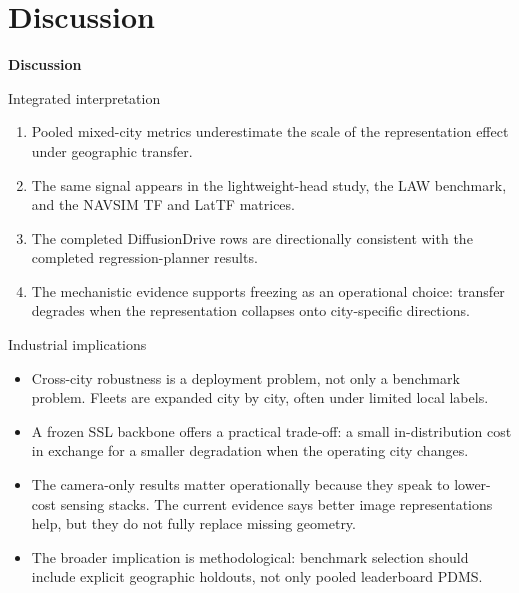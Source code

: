 \documentclass[aspectratio=169, xcolor={table}]{beamer}
\newcommand{\sectiondivider}[1]{%
  \begin{frame}[plain]
    \centering
    \vfill
    {\LARGE \textbf{#1}\par}
    \vfill
  \end{frame}
}
\begin{document}
\section{Discussion}

\sectiondivider{Discussion}

\begin{frame}{Integrated interpretation}
  \begin{enumerate}
    \item Pooled mixed-city metrics underestimate the scale of the representation effect under geographic transfer.
    \item The same signal appears in the lightweight-head study, the LAW benchmark, and the NAVSIM TF and LatTF matrices.
    \item The completed DiffusionDrive rows are directionally consistent with the completed regression-planner results.
    \item The mechanistic evidence supports freezing as an operational choice: transfer degrades when the representation collapses onto city-specific directions.
  \end{enumerate}
\end{frame}

\begin{frame}{Industrial implications}
  \begin{itemize}
    \item Cross-city robustness is a deployment problem, not only a benchmark problem. Fleets are expanded city by city, often under limited local labels.
    \item A frozen SSL backbone offers a practical trade-off: a small in-distribution cost in exchange for a smaller degradation when the operating city changes.
    \item The camera-only results matter operationally because they speak to lower-cost sensing stacks. The current evidence says better image representations help, but they do not fully replace missing geometry.
    \item The broader implication is methodological: benchmark selection should include explicit geographic holdouts, not only pooled leaderboard PDMS.
  \end{itemize}
\end{frame}
\end{document}
